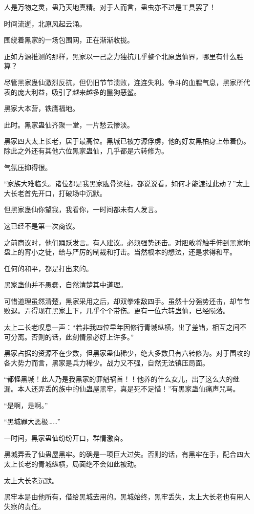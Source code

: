 \begin{this_body}
人是万物之灵，蛊乃天地真精。对于人而言，蛊虫亦不过是工具罢了！

时间流逝，北原风起云涌。

围绕着黑家的一场包围网，正在渐渐收拢。

正如方源推测的那样，黑家以一己之力独抗几乎整个北原蛊仙界，哪里有什么胜算？

尽管黑家蛊仙激烈反抗，但仍旧节节溃败，连连失利。争斗的血腥气息，黑家所代表的庞大利益，吸引了越来越多的鬣狗恶鲨。

黑家大本营，铁鹰福地。

此时。黑家蛊仙齐聚一堂，一片愁云惨淡。

黑家四大太上长老，居于最高位。黑城已被方源俘虏，他的好友黑柏身上带着伤。除此之外还有其他六位黑家蛊仙，几乎都是六转修为。

气氛压抑得很。

“家族大难临头。诸位都是我黑家肱骨梁柱，都说说看，如何才能渡过此劫？”太上大长老首先开口，打破场中沉默。

但黑家蛊仙你望我，我看你，一时间都未有人发言。

这已经不是第一次商议。

之前商议时，他们踊跃发言。有人建议。必须强势还击。对胆敢将触手伸到黑家地盘上的宵小之徒，给与严厉的制裁和打击。当然根本的想法，还是求得和平。

任何的和平，都是打出来的。

黑家蛊仙并不愚蠢，自然清楚其中道理。

可惜道理虽然清楚，黑家采用之后，却双拳难敌四手。虽然十分强势还击，却节节败退。弄得现在黑家上下，几乎个个带伤。更有一位六转蛊仙，已经陨落。

太上二长老叹息一声：“若非我四位早年因修行青城纵横，出了差错，相互之间不可分离。否则的话，此刻情景必好上许多。”

黑家占据的资源不在少数，但黑家蛊仙稀少，绝大多数只有六转修为。对于围攻的各大势力而言，黑家是兵力稀少。战力又不强，自然无法镇压局面。

“都怪黑城！此人乃是我黑家的罪魁祸首！！他养的什么女儿，出了这么大的纰漏。本人还弄丢的族中的仙蛊屋黑牢，真是死不足惜！”有黑家蛊仙痛声咒骂。

“是啊，是啊。”

“黑城罪大恶极……”

一时间，黑家蛊仙纷纷开口，群情激奋。

黑城弄丢了仙蛊屋黑牢。的确是一项巨大过失。否则的话，有黑牢在手，配合四大太上长老的青城纵横，局面绝不会如此被动。

太上大长老沉默。

黑牢本是由他所有，借给黑城去用的。黑城始终，黑牢丢失，太上大长老也有用人失察的责任。


\end{this_body}
